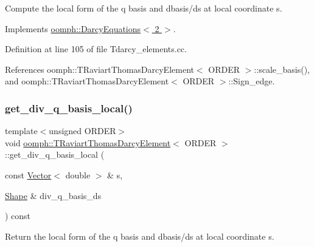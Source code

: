 Compute the local form of the q basis and dbasis/ds at local coordinate s. 



Implements \hyperlink{classoomph_1_1DarcyEquations_ad1d3676060924184befea1157a0735cd}{oomph\+::\+Darcy\+Equations$<$ 2 $>$}.



Definition at line 105 of file Tdarcy\+\_\+elements.\+cc.



References oomph\+::\+T\+Raviart\+Thomas\+Darcy\+Element$<$ O\+R\+D\+E\+R $>$\+::scale\+\_\+basis(), and oomph\+::\+T\+Raviart\+Thomas\+Darcy\+Element$<$ O\+R\+D\+E\+R $>$\+::\+Sign\+\_\+edge.

\mbox{\label{classoomph_1_1TRaviartThomasDarcyElement_a6cbe24cce6930993cba8200964816919}} 
\subsubsection{\texorpdfstring{get\+\_\+div\+\_\+q\+\_\+basis\+\_\+local()}{get\_div\_q\_basis\_local()}\hspace{0.1cm}{\footnotesize\ttfamily [2/3]}}
{\footnotesize\ttfamily template$<$unsigned O\+R\+D\+ER$>$ \\
void \hyperlink{classoomph_1_1TRaviartThomasDarcyElement}{oomph\+::\+T\+Raviart\+Thomas\+Darcy\+Element}$<$ O\+R\+D\+ER $>$\+::get\+\_\+div\+\_\+q\+\_\+basis\+\_\+local (\begin{DoxyParamCaption}\item[{const \hyperlink{classoomph_1_1Vector}{Vector}$<$ double $>$ \&}]{s,  }\item[{\hyperlink{classoomph_1_1Shape}{Shape} \&}]{div\+\_\+q\+\_\+basis\+\_\+ds }\end{DoxyParamCaption}) const\hspace{0.3cm}{\ttfamily [virtual]}}



Return the local form of the q basis and dbasis/ds at local coordinate s. 



